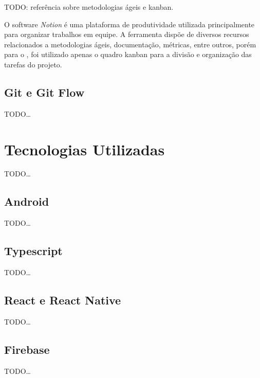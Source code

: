 TODO: referência sobre metodologias ágeis e kanban.

O software \textit{Notion} é uma plataforma de produtividade utilizada principalmente para organizar trabalhos em equipe. A ferramenta dispõe de diversos recursos relacionados a metodologias ágeis, documentação, métricas, entre outros, porém para o \appName, foi utilizado apenas o quadro kanban para a divisão e organização das tarefas do projeto.

\subsection{Git e Git Flow}

TODO\dots

\section{Tecnologias Utilizadas}

TODO\dots

\subsection{Android}

TODO\dots

\subsection{Typescript}

TODO\dots

\subsection{React e React Native}

TODO\dots

\subsection{Firebase}

TODO\dots
